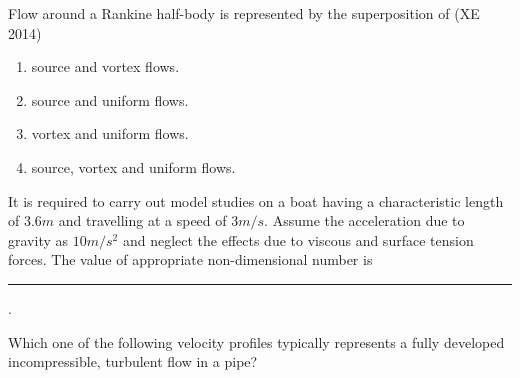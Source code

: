 \iffalse
\title{XE-2014-27-39}
\author{EE24BTECH11041-Mohit}
\section{xe}
\chapter{2014}
\fi

\item Flow around a Rankine half-body is represented by the superposition of
\hfill{(XE 2014)}
\begin{enumerate}

\item source and vortex flows.
\item source and uniform flows.
\item vortex and uniform flows.
\item source, vortex and uniform flows.

\end{enumerate}


\item It is required to carry out model studies on a boat having a characteristic length of $3.6 m$ and travelling at a speed of $3 m/s$. Assume the acceleration due to gravity as $10 m/s^{2}$ and neglect the effects due to viscous and surface tension forces. The value of appropriate non-dimensional number is \rule{2cm}{0.4pt}.

\item Which one of the following velocity profiles typically represents a fully developed incompressible, turbulent flow in a pipe? 

